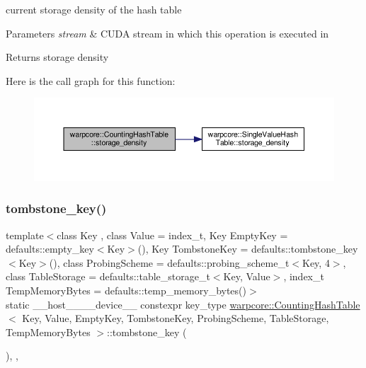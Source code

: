 current storage density of the hash table 


\begin{DoxyParams}{Parameters}
{\em stream} & C\+U\+DA stream in which this operation is executed in \\
\hline
\end{DoxyParams}
\begin{DoxyReturn}{Returns}
storage density 
\end{DoxyReturn}
Here is the call graph for this function\+:
\nopagebreak
\begin{figure}[H]
\begin{center}
\leavevmode
\includegraphics[width=350pt]{classwarpcore_1_1CountingHashTable_aa7b5b49d50edc280ce007cf92abdc4ae_cgraph}
\end{center}
\end{figure}
\mbox{\label{classwarpcore_1_1CountingHashTable_a8b7932f1bb07c36dbcdfc383eb89548e}} 
\subsubsection{\texorpdfstring{tombstone\+\_\+key()}{tombstone\_key()}}
{\footnotesize\ttfamily template$<$class Key , class Value  = index\+\_\+t, Key Empty\+Key = defaults\+::empty\+\_\+key$<$\+Key$>$(), Key Tombstone\+Key = defaults\+::tombstone\+\_\+key$<$\+Key$>$(), class Probing\+Scheme  = defaults\+::probing\+\_\+scheme\+\_\+t$<$\+Key, 4$>$, class Table\+Storage  = defaults\+::table\+\_\+storage\+\_\+t$<$\+Key, Value$>$, index\+\_\+t Temp\+Memory\+Bytes = defaults\+::temp\+\_\+memory\+\_\+bytes()$>$ \\
static \+\_\+\+\_\+host\+\_\+\+\_\+\+\_\+\+\_\+device\+\_\+\+\_\+ constexpr key\+\_\+type \hyperlink{classwarpcore_1_1CountingHashTable}{warpcore\+::\+Counting\+Hash\+Table}$<$ Key, Value, Empty\+Key, Tombstone\+Key, Probing\+Scheme, Table\+Storage, Temp\+Memory\+Bytes $>$\+::tombstone\+\_\+key (\begin{DoxyParamCaption}{ }\end{DoxyParamCaption})\hspace{0.3cm}{\ttfamily [inline]}, {\ttfamily [static]}, {\ttfamily [noexcept]}}



